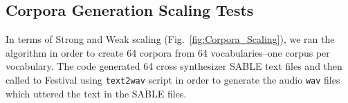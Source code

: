 \documentclass[10pt,journal,compsoc]{IEEEtran}
\begin{document}
\subsection{Corpora Generation Scaling Tests}
\label{CG_Scaling_test}

In terms of Strong and Weak scaling (Fig.~\ref{fig:Corpora_Scaling}), we ran the algorithm in order to create 64 corpora from 64 vocabularies--one corpus per vocabulary. The code generated 64 cross synthesizer SABLE text files and then called to Festival using \texttt{text2wav} script in order to generate the audio \texttt{wav} files which uttered the text in the SABLE files.

\begin{figure}[tb] 
    \centering
    \hfill
\\
    \hfill
\end{figure}
\end{document}
